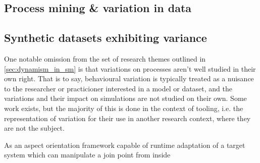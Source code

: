 \subsection{Process mining \& variation in data}

\subsection{Synthetic datasets exhibiting variance}\label{subsec:review_synthetic_datasets}





One notable omission from the set of research themes outlined in
\cref{sec:dynamism_in_sm} is that variations on processes aren't well
studied in their own right. That is to say, behavioural variation is typically
treated as a nuisance to the researcher or practicioner interested in a model or
dataset, and the variations and their impact on simulations are not studied on
their own. Some work exists, but the majority of this is done in the context of tooling, i.e.
the representation of variation for their use in another research context, where
they are not the subject.

As an aspect orientation framework capable of runtime adaptation of a target
system which can manipulate a join point from inside 